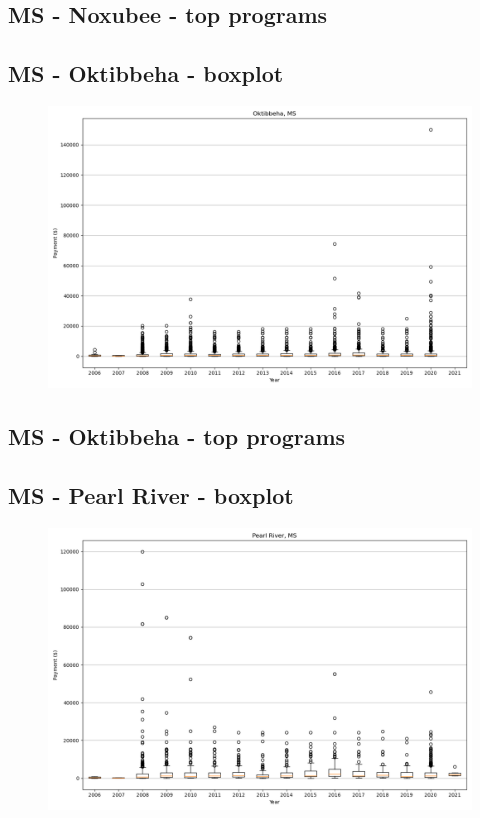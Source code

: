 \subsection*{MS - Noxubee - top programs}

\newpage
\subsection*{MS - Oktibbeha - boxplot}
\begin{figure}[h]
\centering
\includegraphics[width=7in]{../output/boxplots/counties/Oktibbeha-MS_boxplot.png}
\end{figure}


\subsection*{MS - Oktibbeha - top programs}

\newpage
\subsection*{MS - Pearl River - boxplot}
\begin{figure}[h]
\centering
\includegraphics[width=7in]{../output/boxplots/counties/Pearl River-MS_boxplot.png}
\end{figure}


